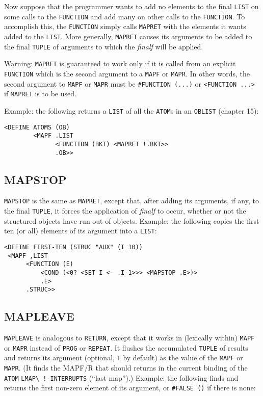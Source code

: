 \documentclass[a4paper]{scrbook}
\begin{document}
Now suppose that the programmer wants to add no elements to the final \texttt{LIST} on some calls to the \texttt{FUNCTION}
and add many on other calls to the \texttt{FUNCTION}. To accomplish this, the \texttt{FUNCTION} simply calls
\texttt{MAPRET} with the elements it wants added to the \texttt{LIST}. More generally, \texttt{MAPRET} causes its arguments
to be added to the final \texttt{TUPLE} of arguments to which the \emph{finalf} will be applied.

Warning: \texttt{MAPRET} is guaranteed to work only if it is called from an explicit \texttt{FUNCTION} which is the second
argument to a \texttt{MAPF} or \texttt{MAPR}. In other words, the second argument to \texttt{MAPF} or \texttt{MAPR} must be
\texttt{\#FUNCTION\ (...)} or \texttt{\textless{}FUNCTION\ ...\textgreater{}} if \texttt{MAPRET} is to be used.

Example: the following returns a \texttt{LIST} of all the \texttt{ATOM}s in an \texttt{OBLIST} (chapter 15):

\begin{verbatim}
<DEFINE ATOMS (OB)
        <MAPF .LIST
              <FUNCTION (BKT) <MAPRET !.BKT>>
              .OB>>
\end{verbatim}

\subsection{MAPSTOP}\label{mapstop}

\texttt{MAPSTOP}  is the same as \texttt{MAPRET}, except that, after adding its arguments,
if any, to the final \texttt{TUPLE}, it forces the application of \emph{finalf} to occur, whether or not the structured
objects have run out of objects. Example: the following copies the first ten (or all) elements of its argument into a
\texttt{LIST}:

\begin{verbatim}
<DEFINE FIRST-TEN (STRUC "AUX" (I 10))
 <MAPF ,LIST
      <FUNCTION (E)
          <COND (<0? <SET I <- .I 1>>> <MAPSTOP .E>)>
          .E>
      .STRUC>>
\end{verbatim}

\subsection{MAPLEAVE}\label{mapleave}

\texttt{MAPLEAVE}  is analogous to \texttt{RETURN}, except that it works in (lexically
within) \texttt{MAPF} or \texttt{MAPR} instead of \texttt{PROG} or \texttt{REPEAT}. It flushes the accumulated
\texttt{TUPLE} of results and returns its argument (optional, \texttt{T} by default) as the value of the \texttt{MAPF} or
\texttt{MAPR}. (It finds the MAPF/R that should returns in the current binding of the \texttt{ATOM}
\texttt{LMAP\textbackslash{}\ !-INTERRUPTS}  (``last map'').) Example: the
following finds and returns the first non-zero element of its argument, or \texttt{\#FALSE\ ()} if there is none:
\end{document}
